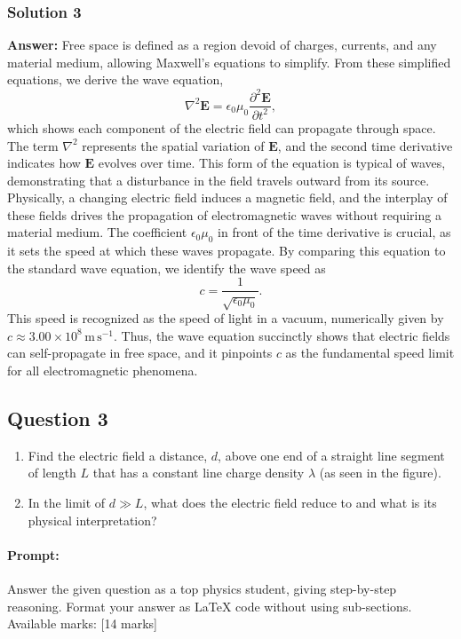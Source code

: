 \documentclass{article}
\begin{document}
\subsubsection{Solution 3}
\textbf{Answer:} Free space is defined as a region devoid of charges, currents, and any material medium, allowing Maxwell’s equations to simplify. From these simplified equations, we derive the wave equation,
\[
\nabla^2 \mathbf{E} = \epsilon_0 \mu_0 \frac{\partial^2 \mathbf{E}}{\partial t^2},
\]
which shows each component of the electric field can propagate through space. The term $\nabla^2$ represents the spatial variation of $\mathbf{E}$, and the second time derivative indicates how $\mathbf{E}$ evolves over time. This form of the equation is typical of waves, demonstrating that a disturbance in the field travels outward from its source. Physically, a changing electric field induces a magnetic field, and the interplay of these fields drives the propagation of electromagnetic waves without requiring a material medium. The coefficient $\epsilon_0 \mu_0$ in front of the time derivative is crucial, as it sets the speed at which these waves propagate. By comparing this equation to the standard wave equation, we identify the wave speed as
\[
c = \frac{1}{\sqrt{\epsilon_0 \mu_0}}.
\]
This speed is recognized as the speed of light in a vacuum, numerically given by $c \approx 3.00\times10^8\,\text{m}\,\text{s}^{-1}$. Thus, the wave equation succinctly shows that electric fields can self-propagate in free space, and it pinpoints $c$ as the fundamental speed limit for all electromagnetic phenomena.


\subsection{Question 3}
\begin{enumerate}
    \item Find the electric field a distance, \( d \), above one end of a straight line segment of length \( L \) that has a constant line charge density \( \lambda \) (as seen in the figure).
    \item In the limit of \( d \gg L \), what does the electric field reduce to and what is its physical interpretation?
\end{enumerate}


\paragraph{Prompt: \\} 
Answer the given question as a top physics student, giving step-by-step reasoning. Format your answer as LaTeX code without using sub-sections. Available marks: [14 marks]
\end{document}
